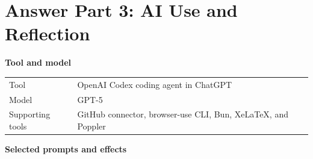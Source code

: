 \documentclass[10pt,a4paper]{article}
\begin{document}
\section{Answer Part 3: AI Use and Reflection}

\textbf{Tool and model}

\begin{tabular}{@{}p{34mm}p{124mm}@{}}
  \toprule
  Tool & OpenAI Codex coding agent in ChatGPT \\
  Model & GPT-5 \\
  Supporting tools & GitHub connector, browser-use CLI, Bun, XeLaTeX, and Poppler \\
  \bottomrule
\end{tabular}

\vspace{2mm}
\textbf{Selected prompts and effects}
\end{document}
